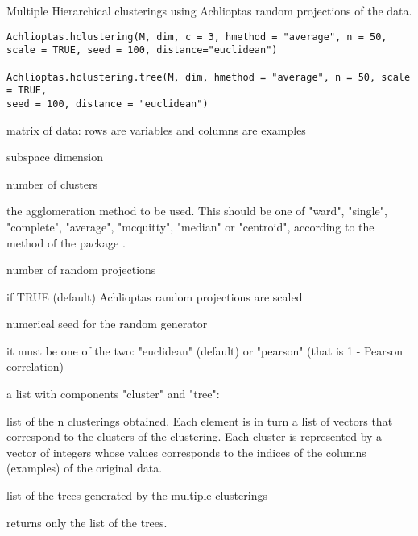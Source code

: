 \documentclass{article}
\begin{document}
\begin{Description}\relax
Multiple Hierarchical clusterings using Achlioptas random projections of the data.
\end{Description}
\begin{Usage}
\begin{verbatim}
Achlioptas.hclustering(M, dim, c = 3, hmethod = "average", n = 50, 
scale = TRUE, seed = 100, distance="euclidean")

Achlioptas.hclustering.tree(M, dim, hmethod = "average", n = 50, scale = TRUE, 
seed = 100, distance = "euclidean")

\end{verbatim}
\end{Usage}
\begin{Arguments}
\begin{ldescription}
\item[\code{M}] matrix of data: rows are variables and columns are examples 
\item[\code{dim}] subspace dimension 
\item[\code{c}] number of clusters 
\item[\code{hmethod}] the agglomeration method to be used. This should be one of 
"ward", "single", "complete", "average", "mcquitty", "median" or "centroid", 
according to the 
method of the package . 
\item[\code{n}] number of  random projections 
\item[\code{scale}] if TRUE (default) Achlioptas random projections are scaled 
\item[\code{seed}] numerical seed for the random generator 
\item[\code{distance}] it must be one of the two: "euclidean" (default) or "pearson" (that is 1 - Pearson correlation) 
\end{ldescription}
\end{Arguments}
\begin{Value}
a list with components "cluster" and "tree":
\begin{ldescription}
\item[\code{cluster }] list of the n clusterings obtained. Each element is in turn a list of vectors that correspond 
to the clusters of the clustering. Each cluster is represented by a vector of integers whose values corresponds to 
the indices of the columns (examples) of the original data. 
\item[\code{tree }] list of the trees generated by the multiple clusterings
\end{ldescription}


 returns only the list of the trees.
\end{Value}
\end{document}
